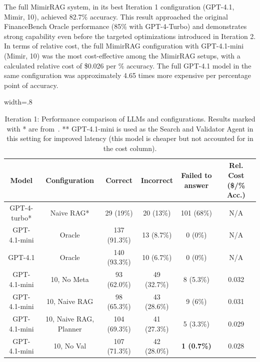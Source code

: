 \documentclass[final,5p,times,twopage,twocolumn,a4paper]{elsarticle}
\begin{document}
The full MimirRAG system, in its best Iteration 1 configuration (GPT-4.1, Mimir, 10), achieved 82.7\% accuracy. This result approached the original FinanceBench Oracle performance (85\% with GPT-4-Turbo) and demonstrates strong capability even before the targeted optimizations introduced in Iteration 2. In terms of relative cost, the full MimirRAG configuration with GPT-4.1-mini (Mimir, 10) was the most cost-effective among the MimirRAG setups, with a calculated relative cost of \$0.026 per \% accuracy. The full GPT-4.1 model in the same configuration was approximately 4.65 times more expensive per percentage point of accuracy.
%
\begin{table}[!hbt]
\centering
\caption{Iteration 1: Performance comparison of LLMs and configurations. Results marked with * are from~\cite{islam2023financebench}. ** GPT-4.1-mini is used as the Search and Validator Agent in this setting for improved latency (this model is cheaper but not accounted for in the cost column).}
\label{tab:model-performance-iter1}
\begin{adjustbox}{width=.8\textwidth}
\begin{tabular}{|c|c|c|c|c|c|}
\hline
\textbf{Model} & \textbf{Configuration} & \textbf{Correct}      & \textbf{Incorrect}   & \textbf{Failed to answer} & \textbf{Rel. Cost (\$/\% Acc.)} \\ \hline
GPT-4-turbo*   & Naive RAG*             & 29 (19\%)             & 20 (13\%)            & 101 (68\%)                & N/A                             \\ \hline
GPT-4.1-mini   & Oracle                 & 137 (91.3\%)          & 13 (8.7\%)           & 0 (0\%)                   & N/A                             \\ \hline
GPT-4.1        & Oracle                 & 140 (93.3\%)          & 10 (6.7\%)           & 0 (0\%)                   & N/A
                        \\ \hline
GPT-4.1-mini   & 10, No Meta            & 93 (62.0\%)           & 49 (32.7\%)          & 8 (5.3\%)                 & 0.032                           \\ \hline
GPT-4.1-mini   & 10, Naive RAG          & 98 (65.3\%)           & 43 (28.6\%)          & 9 (6\%)                   & 0.031                           \\ \hline
GPT-4.1-mini   & 10, Naive RAG, Planner & 104 (69.3\%)          & 41 (27.3\%)          & 5 (3.3\%)                 & 0.029                           \\ \hline
GPT-4.1-mini   & 10, No Val             & 107 (71.3\%)          & 42 (28.0\%)          & \textbf{1 (0.7\%)}        & 0.028                           \\ \hline

\end{tabular}
\end{adjustbox}
\end{table}
\end{document}
